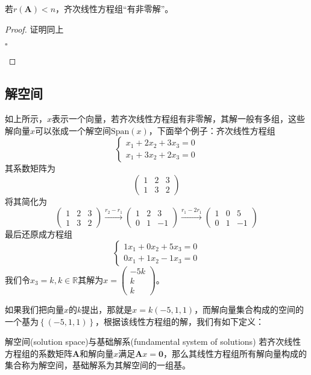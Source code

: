 \begin{corollary}
	若$r(\mathbf{A})< n$，齐次线性方程组``有非零解''。
\end{corollary}

\begin{proof}
	证明同上\begin{flushright}
		$\square$
	\end{flushright}
\end{proof}

\subsection{解空间}

如上所示，$x$表示一个向量，若齐次线性方程组有非零解，其解一般有多组，这些解向量$x$可以张成一个解空间$\text{Span}(x)$，下面举个例子：齐次线性方程组$$\left\{\begin{matrix} 
	x_1+2x_2+3x_3=0 \\  
	x_1+3x_2+2x_3=0
\end{matrix}\right. $$其系数矩阵为$$\begin{pmatrix}
	1 & 2 & 3 \\
	1 & 3 & 2
\end{pmatrix}$$将其简化为$$\begin{pmatrix}
	1 & 2 & 3 \\
	1 & 3 & 2
\end{pmatrix}\xrightarrow{r_2-r_1} \begin{pmatrix}
	1 & 2 & 3 \\
	0 & 1 & -1
\end{pmatrix}\xrightarrow{r_1-2r_1}\begin{pmatrix}
	1 & 0 & 5 \\
	0 & 1 & -1
\end{pmatrix}$$最后还原成方程组$$\left\{\begin{matrix} 
	1x_1+0x_2+5x_3=0 \\  
	0x_1+1x_2-1x_3=0
\end{matrix}\right. $$我们令$x_3=k,k\in \mathbb{R}$其解为$x=\begin{pmatrix}
	-5k\\
	k\\
	k
\end{pmatrix}$。

如果我们把向量$x$的$k$提出，那就是$x=k(-5,1,1)$，而解向量集合构成的空间的一个基为$\left\{ \left( -5,1,1 \right) \right\}$，根据该线性方程组的解，我们有如下定义：

\begin{definition}{解空间(solution space)与基础解系(fundamental system of solutions)}
	若齐次线性方程组的系数矩阵$\mathbf{A}$和解向量$x$满足$\mathbf{A}x=\boldsymbol{0}$，那么其线性方程组所有解向量构成的集合称为解空间，基础解系为其解空间的一组基。
\end{definition}

